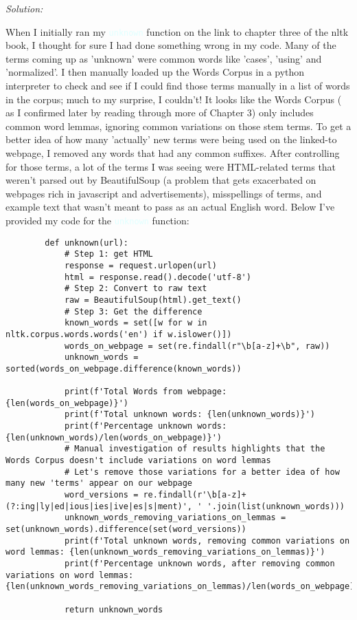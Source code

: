 \documentclass[11pt]{article}
\newenvironment{solution}{
	\vspace{10px}\noindent\emph{Solution:}
}{
	\vspace{10px}
}
\newcommand{\codeword}[1]{
	\texttt{\textcolor{lightCyan}{#1}}
}
\begin{document}
\begin{solution}
	
	When I initially ran my \codeword{unknown} function on the link to chapter three of the nltk book, I thought for sure I had done something wrong in my code. Many of the terms coming up as 'unknown' were common words like 'cases', 'using' and 'normalized'.  I then manually loaded up the Words Corpus in a python interpreter to check and see if I could find those terms manually in a list of words in the corpus; much to my surprise, I couldn't! It looks like the Words Corpus ( as I confirmed later by reading through more of Chapter 3) only includes common word lemmas, ignoring common variations on those stem terms. To get a better idea of how many 'actually' new terms were being used on the linked-to  webpage, I removed any words that had any common suffixes. After controlling for those terms, a lot of the terms I was seeing were HTML-related terms that weren't parsed out by BeautifulSoup (a problem that gets exacerbated on webpages rich in javascript and advertisements), misspellings of terms, and example text that wasn't meant to pass as an actual English word. Below I've provided my code for the \codeword{unknown} function:
	
	\begin{lstlisting}
		def unknown(url): 
			# Step 1: get HTML
			response = request.urlopen(url)
			html = response.read().decode('utf-8')
			# Step 2: Convert to raw text
			raw = BeautifulSoup(html).get_text()
			# Step 3: Get the difference  
			known_words = set([w for w in nltk.corpus.words.words('en') if w.islower()])
			words_on_webpage = set(re.findall(r"\b[a-z]+\b", raw))
			unknown_words = sorted(words_on_webpage.difference(known_words))
			
			print(f'Total Words from webpage: {len(words_on_webpage)}')
			print(f'Total unknown words: {len(unknown_words)}')
			print(f'Percentage unknown words: {len(unknown_words)/len(words_on_webpage)}')
			# Manual investigation of results highlights that the Words Corpus doesn't include variations on word lemmas 
			# Let's remove those variations for a better idea of how many new 'terms' appear on our webpage 
			word_versions = re.findall(r'\b[a-z]+(?:ing|ly|ed|ious|ies|ive|es|s|ment)', ' '.join(list(unknown_words)))
			unknown_words_removing_variations_on_lemmas = set(unknown_words).difference(set(word_versions))
			print(f'Total unknown words, removing common variations on word lemmas: {len(unknown_words_removing_variations_on_lemmas)}')
			print(f'Percentage unknown words, after removing common variations on word lemmas: {len(unknown_words_removing_variations_on_lemmas)/len(words_on_webpage)}')
			
    		return unknown_words
		
	\end{lstlisting}

\end{solution} 
\end{document}
